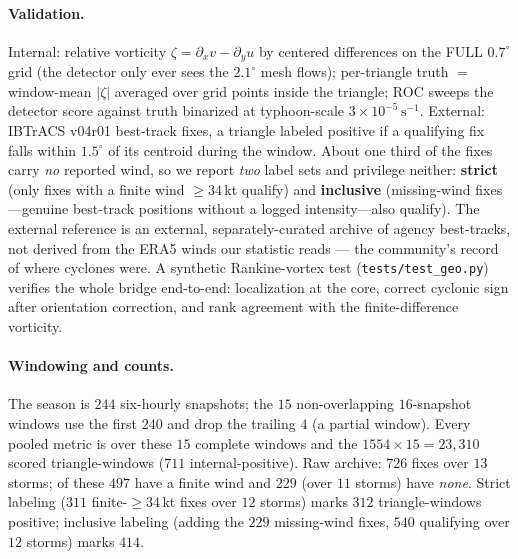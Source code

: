 \documentclass[11pt]{article}
\begin{document}
\paragraph{Validation.} Internal: relative vorticity
$\zeta=\partial_x v-\partial_y u$ by centered differences on the FULL
$0.7^\circ$ grid (the detector only ever sees the $2.1^\circ$ mesh flows);
per-triangle truth $=$ window-mean $|\zeta|$ averaged over grid points inside
the triangle; ROC sweeps the detector score against truth binarized at
typhoon-scale $3\times10^{-5}\,\mathrm{s}^{-1}$. External: IBTrACS v04r01
best-track fixes, a triangle labeled positive if a qualifying fix falls within
$1.5^\circ$ of its centroid during the window. About one third of the fixes
carry \emph{no} reported wind, so we report \emph{two} label sets and privilege
neither: \textbf{strict} (only fixes with a finite wind $\ge34$\,kt qualify) and
\textbf{inclusive} (missing-wind fixes---genuine best-track positions without a
logged intensity---also qualify). The external reference is an external,
separately-curated archive of agency best-tracks, not derived from the ERA5
winds our statistic reads --- the community's record of where cyclones were. A synthetic Rankine-vortex test (\texttt{tests/test\_geo.py})
verifies the whole bridge end-to-end: localization at the core, correct
cyclonic sign after orientation correction, and rank agreement with the
finite-difference vorticity.

\paragraph{Windowing and counts.} The season is $244$ six-hourly snapshots;
the $15$ non-overlapping $16$-snapshot windows use the first $240$ and drop the
trailing $4$ (a partial window). Every pooled metric is over these $15$
complete windows and the $1554\times15=23{,}310$ scored triangle-windows ($711$
internal-positive). Raw archive: $726$ fixes over $13$ storms; of these
$497$ have a finite wind and $229$ (over $11$ storms) have \emph{none}. Strict
labeling ($311$ finite-$\ge34$\,kt fixes over $12$ storms) marks $312$
triangle-windows positive; inclusive labeling (adding the $229$ missing-wind
fixes, $540$ qualifying over $12$ storms) marks $414$.
\end{document}
